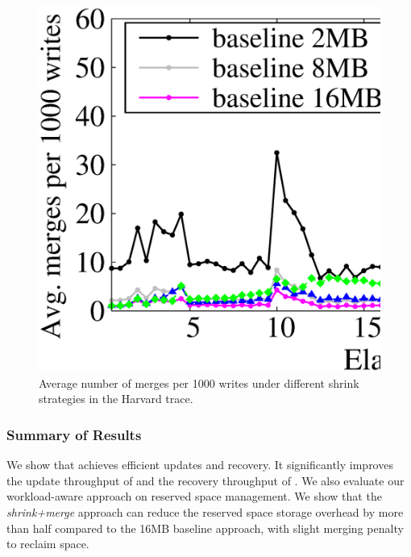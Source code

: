 \begin{figure}[t!]
    \centering
    \includegraphics[width=\linewidth]{charts/harvard_merge/harvard_merge.eps}
    \vspace{-2em}
    \caption{Average number of merges per 1000 writes under different shrink
        strategies in the Harvard trace.}
    \label{fig:harvard_merge}
\end{figure}

%

\subsubsection{Summary of Results}

We show that \PLR achieves efficient updates and recovery.  It significantly
improves the update throughput of \FO and the recovery throughput of \FL. 
We also evaluate our workload-aware approach on reserved space management. 
We show that the \textit{shrink+merge} approach can reduce the reserved space
storage overhead by more than half compared to the 16MB baseline approach, with
slight merging penalty to reclaim space.  

\setlength\abovecaptionskip{10pt}
\setlength\belowcaptionskip{0pt}
